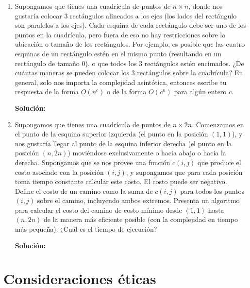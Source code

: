 \documentclass[11pt,letterpaper]{article}
\newenvironment{solution}{%
  \noindent\begin{shaded}
  \textbf{Solución:}\ }{
  \end{shaded}%
}
\begin{document}
\begin{enumerate}
\item%
  Supongamos que tienes una cuadrícula de puntos de \(n \times n\),
  donde nos gustaría colocar \(3\) rectángulos alineados a los ejes
  (los lados del rectángulo son paralelos a los ejes).  Cada esquina
  de cada rectángulo debe ser uno de los puntos en la cuadrícula, pero
  fuera de eso no hay restricciones sobre la ubicación o tamaño de los
  rectángulos.  Por ejemplo, es posible que las cuatro esquinas de un
  rectángulo estén en el mismo punto (resultando en un rectángulo de
  tamaño \(0\)), o que todos los \(3\) rectángulos estén encimados.
  ¿De cuántas maneras se pueden colocar los \(3\) rectángulos sobre la
  cuadrícula?  En general, solo nos importa la complejidad asintótica,
  entonces escribe tu respuesta de la forma \(O(n^c)\) o de la forma
  \(O(c^n)\) para algún entero \(c\).
  \begin{solution}
  \end{solution}
\item%
  Supongamos que tienes una cuadrícula de puntos de \(n \times 2n\).
  Comenzamos en el punto de la esquina superior izquierda (el punto en
  la posición \((1,1)\)), y nos gustaría llegar al punto de la esquina
  inferior derecha (el punto en la posición \((n, 2n)\)) moviéndose
  exclusivamente o hacia abajo o hacia la derecha.  Supongamos que se
  nos provee una función \(c(i,j)\) que produce el costo asociado con
  la posición \((i,j)\), y supongamos que para cada posición toma
  tiempo constante calcular este costo.  El costo puede ser negativo.
  Define el costo de un camino como la suma de \(c(i,j)\) para todos
  los puntos \((i,j)\) sobre el camino, incluyendo ambos extremos.
  Presenta un algoritmo para calcular el costo del camino de costo
  mínimo desde \((1,1)\) hasta \((n,2n)\) de la manera más eficiente
  posible (con la complejidad en tiempo más pequeña).  ¿Cuál es el
  tiempo de ejecución?
  \begin{solution}
  \end{solution}
\end{enumerate}



\section*{Consideraciones éticas}
\end{document}
